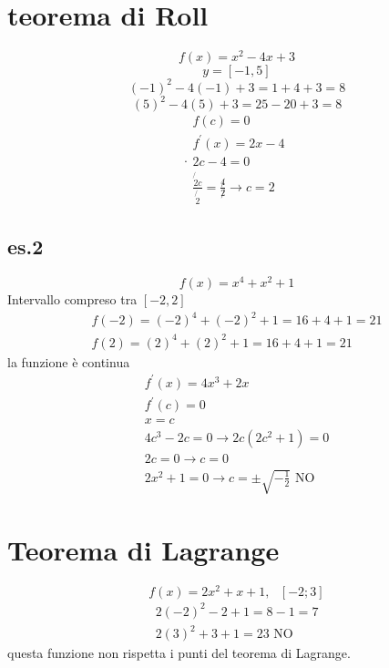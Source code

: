 \documentclass{article}
\begin{document}
	\section{teorema di Roll}
		\begin{equation*}
			f(x)=x^2-4x+3
		\end{equation*}
	\begin{equation*}
		y=[-1,5]
	\end{equation*}
		\begin{equation*}
			(-1)^2-4(-1)+3=1+4+3=8
		\end{equation*}
		\begin{equation*}
			(5)^2-4(5)+3=25-20+3=8
		\end{equation*}
		\begin{equation}
	.		\begin{matrix}
				f(c)=0\\
				f^\prime(x)=2x-4\\
				2c-4=0\\
				\frac{\not{2}c}{\not{2}}=\frac{\not4}{\not2}\to c=2
			\end{matrix}
		\end{equation}
		\subsection{es.2}
		\begin{equation*}
			f(x)=x^4+x^2+1
		\end{equation*}
		Intervallo compreso tra $[-2,2]$
		\begin{equation*}
			\begin{matrix}
				f(-2)=(-2)^4+(-2)^2+1=16+4+1=21\\
				f(2)=(2)^4+(2)^2+1=16+4+1=21
			\end{matrix}
		\end{equation*}
		la funzione è continua
		\begin{equation*}
			\begin{matrix}
				f^\prime(x)=4x^3+2x\\
				f^\prime(c)=0\\
				x=c\\
				4c^3-2c=0 \to 2c(2c^2+1)=0\\
				2c=0\to c=0\\
				2x^2+1=0\to c=\pm\sqrt{-\frac{1}{2}} \text{ NO}
			\end{matrix}
		\end{equation*}
	\section{Teorema di Lagrange}
	\begin{equation*}
		f(x)=2x^2+x+1, \text{ } [-2;3]
	\end{equation*}
	\begin{equation*}
		\begin{matrix}
			2(-2)^2-2+1=8-1=7\\
			2(3)^2+3+1=23 \text{ NO}
		\end{matrix}
	\end{equation*}
questa funzione non rispetta i punti del teorema di Lagrange.
\end{document}
